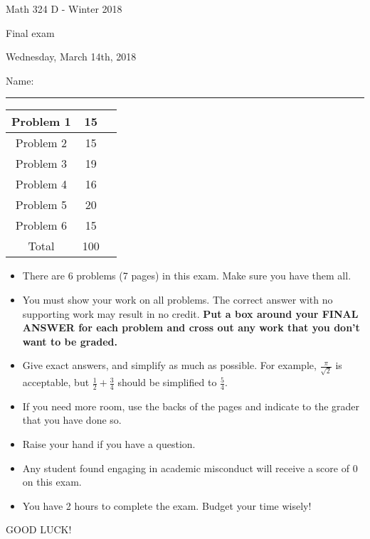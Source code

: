 \documentclass[12 pt]{report}
\begin{document}
\noindent \vfill \noindent \large

\centerline{Math 324 D  - Winter 2018}

\centerline{Final exam}

\centerline{Wednesday, March 14th, 2018}

\normalsize

\vfill
\medskip
Name: \rule{10cm}{1pt}

\bigskip

\vfill
\begin{center}
{\large
\begin{tabular}{||c|c|r||}
\hline Problem 1 & 15 & \hspace{10mm} \hfill \\
\hline Problem 2 & 15 & \hspace{10mm} \hfill \\
\hline Problem 3 & 19 & \hspace{10mm} \hfill \\
\hline Problem 4 & 16  & \hspace{10mm} \hfill \\
\hline Problem 5 & 20  & \hspace{10mm} \hfill \\
\hline Problem 6 &  15 & \hspace{10mm} \hfill \\
\hline Total & 100 & \hspace{10mm} \hfill \\
\hline
\end{tabular}
}
\end{center}
\vfill
\begin{itemize}
\item There are 6 problems (7 pages) in this exam. Make sure you have them all. 
\item You must show your work on all problems.  The correct answer
with no supporting work may result in no credit. \textbf{Put a box
around your FINAL ANSWER for each problem and cross out any work
that you don't want to be graded.} 
\item Give exact answers, and simplify as much as possible. 
For example, $\frac{\pi}{\sqrt{2}}$ is acceptable, but $\frac{1}{2} + \frac{3}{4}$
should be simplified to $\frac{5}{4}$.   

\item If you need more room, use the backs
of the pages and indicate to the grader that you have done so.
\item Raise your hand if you have a question.
\item Any student found engaging in academic misconduct will receive
a score of 0 on this exam.
\item You have 2 hours to complete the exam.  Budget your time wisely! \\
\end{itemize}
\vfill
\begin{center}GOOD LUCK!\end{center}
\end{document}
